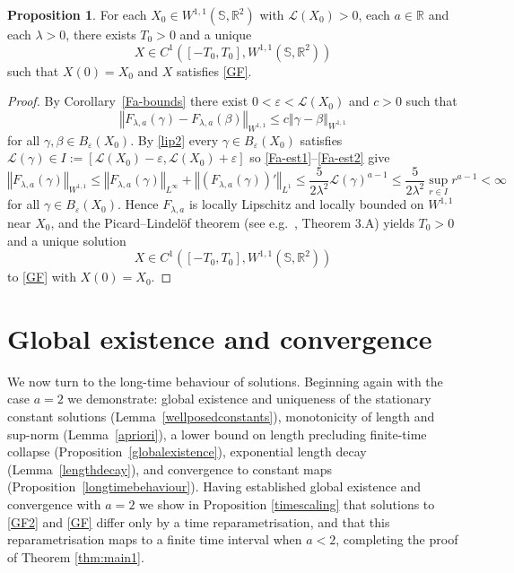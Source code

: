\documentclass[a4paper,11pt]{amsart}
\theoremstyle{definition}\newtheorem*{definition}{Definition}
\theoremstyle{definition} \newtheorem{proposition}[theorem]{Proposition}
\theoremstyle{definition}\newtheorem{lemma}[theorem]{Lemma}
\theoremstyle{definition}\newtheorem{corollary}[theorem]{Corollary}
\theoremstyle{definition}\newtheorem{example}{Example}
\theoremstyle{remark}\newtheorem*{remark}{Remark}
\def\R{\mathbb{R}}
\def\S{\mathbb{S}}
\newcommand{\norm}[1]{{\left \Vert {#1}\right \Vert}}
\def\length{\mathcal L}
\begin{document}
\begin{proposition}\label{existence}
For each $X_0\in W^{1,1}(\S,\R^2)$ with $\length(X_0)>0$, each $a\in\R$ and each $\lambda>0$, there exists $T_0>0$ and a unique
\[
X\in C^1([-T_0,T_0],W^{1,1}(\S,\R^2))
\]
such that $X(0)=X_0$ and $X$ satisfies \eqref{GF}.
\end{proposition}
\begin{proof}
By Corollary~\ref{Fa-bounds} there exist $0<\varepsilon<\length(X_0)$ and $c>0$ such that
\[
\norm{F_{\lambda,a}(\gamma)-F_{\lambda,a}(\beta)}_{W^{1,1}}
\leq c\norm{\gamma-\beta}_{W^{1,1}}
\]
for all $\gamma,\beta\in B_\varepsilon(X_0)$. By \eqref{lip2} every $\gamma\in B_\varepsilon(X_0)$ satisfies
$\length(\gamma)\in I:=[\length(X_0)-\varepsilon,\length(X_0)+\varepsilon]
$
so \eqref{Fa-est1}--\eqref{Fa-est2} give
\[
\norm{F_{\lambda,a}(\gamma)}_{W^{1,1}}
\leq \norm{F_{\lambda,a}(\gamma)}_{L^\infty}+\norm{(F_{\lambda,a}(\gamma))'}_{L^1}\leq \frac{5}{2\lambda^2} \length(\gamma)^{a-1}
\leq \frac{5}{2\lambda^2}\sup_{r\in I}r^{a-1}<\infty
\]
for all $\gamma\in B_\varepsilon(X_0)$.
Hence $F_{\lambda,a}$ is locally Lipschitz and locally bounded on $W^{1,1}$ near $X_0$, and the Picard--Lindel\"of theorem (see e.g.\ \cite{Zeidler:1986aa}, Theorem 3.A) yields $T_0>0$ and a unique solution
\[
X\in C^1([-T_0,T_0],W^{1,1}(\S,\R^2))
\]
to \eqref{GF} with $X(0)=X_0$.
\end{proof}




\section{Global existence and convergence}
\label{sec:conv}

We now turn to the long-time behaviour of solutions. Beginning again with the case $a=2$ we demonstrate: global existence and uniqueness of the stationary constant solutions (Lemma~\ref{wellposedconstants}), monotonicity of length and sup-norm (Lemma~\ref{apriori}), a lower bound on length precluding finite-time collapse (Proposition~\ref{globalexistence}), exponential length decay (Lemma~\ref{lengthdecay}), and convergence to constant maps (Proposition~\ref{longtimebehaviour}). Having established global existence and convergence with $a=2$ we show in Proposition \ref{timescaling} that solutions to \eqref{GF2} and \eqref{GF} differ only by a time reparametrisation, and that this reparametrisation maps to a finite time interval when $a<2$, completing the proof of Theorem \ref{thm:main1}.
\end{document}
